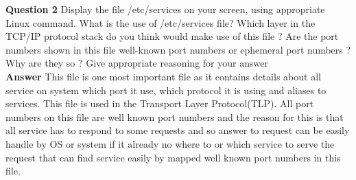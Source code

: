 \documentclass[14pt]{extarticle}
\begin{document}
    
    \noindent
    \textbf{\large Question 2}
    Display the file /etc/services on your screen, using appropriate Linux command. What is the use of
/etc/services file? Which layer in the TCP/IP protocol stack do you think would make use of this file
? Are the port numbers shown in this file well-known port numbers or ephemeral port numbers ? Why
are they so ? Give appropriate reasoning for your answer\\[10pt]
    \textbf{\large Answer}
    This file is one most important file as it contains details about all service on system which port it use, which protocol it is using and aliases to services.
    This file is used in the Transport Layer Protocol(TLP). 
    All port numbers on this file are well known port numbers and the reason for this is that all service has to respond to some requests and so answer to request can be easily handle by OS or system
    if it already no where to or which service to serve the request that can find service easily by mapped well known port numbers in this file.\\[8pt]
    \vspace{1cm}
\end{document}
